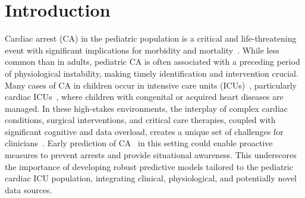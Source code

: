 \section{Introduction}


Cardiac arrest (CA) in the pediatric population is a critical and life-threatening event with significant implications for morbidity and mortality~\cite{frazier2021risk}. While less common than in adults, pediatric CA is often associated with a preceding period of physiological instability, making timely identification and intervention crucial. Many cases of CA in children occur in intensive care units (ICUs)~\cite{zeng2020pic}, particularly cardiac ICUs~\cite{morgan2021cicu}, where children with congenital or acquired heart diseases are managed. In these high-stakes environments, the interplay of complex cardiac conditions, surgical interventions, and critical care therapies, coupled with significant cognitive and data overload,
creates a unique set of challenges for clinicians~\cite{winters2018society}. Early prediction of CA~\cite{brown2025MLCA} in this setting could enable proactive measures to prevent arrests and provide situational awareness. This underscores the importance of developing robust predictive models tailored to the pediatric cardiac ICU population, integrating clinical, physiological, and potentially novel data sources.

